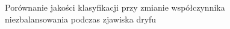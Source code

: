 \vspace{-1.2cm}

\begin{figure}[h]
    \centering
    \qquad
    \caption{Porównanie jakości klasyfikacji przy zmianie współczynnika niezbalansowania podczas zjawiska dryfu}\label{Figure:DriftImbalance}
\end{figure}

\newpage

